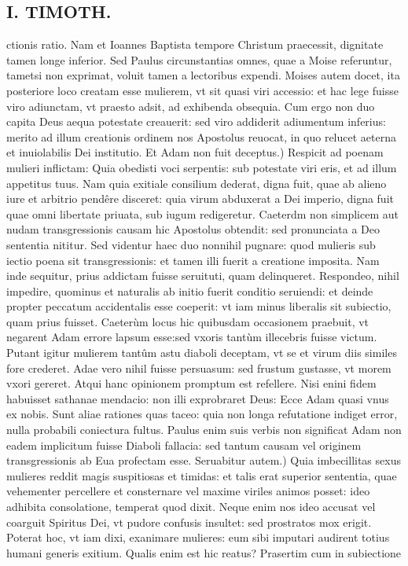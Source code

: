 \documentclass{article}
\begin{document}
\begin{pages}
\section*{I. TIMOTH. }
\marginpar{[ p.28 ]}\pstart ctionis ratio. Nam et Ioannes Baptista tempore Christum praecessit, dignitate tamen longe inferior. Sed Paulus circunstantias omnes, quae a Moise referuntur, tametsi non exprimat, voluit tamen a lectoribus expendi. Moises autem docet, ita posteriore loco creatam esse mulierem, vt sit quasi viri accessio: et hac lege fuisse viro adiunctam, vt praesto adsit, ad exhibenda obsequia. Cum ergo non duo capita Deus aequa potestate creauerit: sed viro addiderit adiumentum inferius: merito ad illum creationis ordinem nos Apostolus reuocat, in quo relucet aeterna et inuiolabilis Dei institutio.  \pend\pstart Et Adam non fuit deceptus.) Respicit ad poenam mulieri inflictam: Quia obedisti voci serpentis: sub potestate viri eris, et ad illum appetitus tuus. Nam quia exitiale consilium dederat, digna fuit, quae ab alieno iure et arbitrio pendêre disceret: quia virum abduxerat a Dei imperio, digna fuit quae omni libertate priuata, sub iugum redigeretur. Caeterdm non simplicem aut nudam transgressionis causam hic Apostolus obtendit: sed pronunciata a Deo sententia nititur. Sed videntur haec duo nonnihil pugnare: quod mulieris sub iectio poena sit transgressionis: et tamen illi fuerit a creatione imposita. Nam inde sequitur, prius addictam fuisse seruituti, quam delinqueret. Respondeo, nihil impedire, quominus et naturalis ab initio fuerit conditio seruiendi: et deinde propter peccatum accidentalis esse coeperit: vt iam minus liberalis sit subiectio, quam prius fuisset. Caeterùm locus hic quibusdam occasionem praebuit, vt negarent Adam errore lapsum esse:sed vxoris tantùm illecebris fuisse victum. Putant igitur mulierem tantûm astu diaboli deceptam, vt se et virum diis similes fore crederet. Adae vero nihil fuisse persuasum: sed frustum gustasse, vt morem vxori gereret. Atqui hanc opinionem promptum est refellere. Nisi enini fidem habuisset sathanae mendacio: non illi exprobraret Deus: Ecce Adam quasi vnus ex nobis. Sunt aliae rationes quas taceo: quia non longa refutatione indiget error, nulla probabili coniectura fultus. Paulus enim suis verbis non significat Adam non eadem implicitum fuisse Diaboli fallacia: sed tantum causam vel originem transgressionis ab Eua profectam esse.  \pend\pstart Seruabitur autem.) Quia imbecillitas sexus mulieres reddit magis suspitiosas et timidas: et talis erat superior sententia, quae vehementer percellere et consternare vel maxime viriles animos posset: ideo adhibita consolatione, temperat quod dixit. Neque enim nos ideo accusat vel coarguit Spiritus Dei, vt pudore confusis insultet: sed prostratos mox erigit. Poterat hoc, vt iam dixi, exanimare mulieres: eum sibi imputari audirent totius humani generis exitium. Qualis enim est hic reatus? Prasertim cum in subiectione  \pend

\end{pages}
\end{document}
